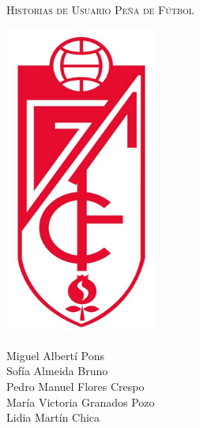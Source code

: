 \documentclass[11pt]{article}
\begin{document}
\begin{titlepage}
\centering
\vspace{4.5cm}
{\scshape\LARGE Historias de Usuario Peña de Fútbol\par}
\vspace{1.5cm}

\includegraphics[width=5cm]{escudoGR}

\vspace{3cm}
{\scshape\large \par}
\vspace{1cm}

{Miguel Albertí Pons\\
Sofía Almeida Bruno\\
Pedro Manuel Flores Crespo\\
María Victoria Granados Pozo\\
Lidia Martín Chica
\par}

\end{titlepage}
\newpage
\end{document}
